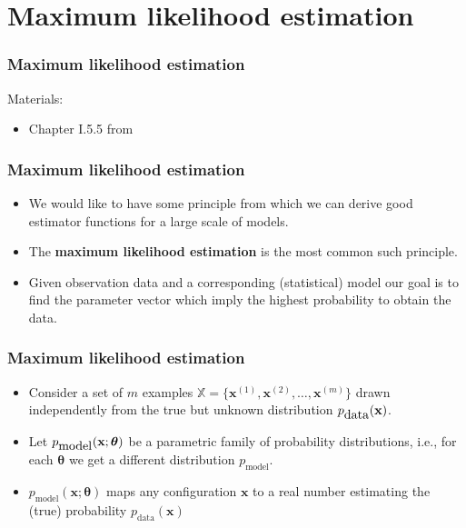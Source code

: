 \documentclass[notes]{beamer}          %
\newcommand{\vect}[1]{\bm{#1}}
\newcommand{\field}[1]{\mathbb{#1}}
\begin{document}
\section{Maximum likelihood estimation}

\begin{frame}
\frametitle{Maximum likelihood estimation}
Materials:
\begin{itemize}
    \item Chapter I.5.5 from \cite{deeplearning}
\end{itemize}
\end{frame}

\begin{frame}
\frametitle{Maximum likelihood estimation}
    \begin{itemize}
        \item We would like to have some principle from which we can derive good estimator functions for a large scale of models.
        \item The {\bf maximum likelihood estimation} is the most common such principle.
        \item Given observation data and a corresponding (statistical) model our goal is to find the parameter vector which imply the highest probability to obtain the data.
    \end{itemize}
\end{frame}


\begin{frame}
\frametitle{Maximum likelihood estimation}
    \begin{itemize}
        \item Consider a set of $m$ examples $\field{X} = \{ \vect{x}^{(1)}, \vect{x}^{(2)}, \ldots,  \vect{x}^{(m)} \}$ drawn independently from the true but unknown distribution $p_{\mbox{data}}(\text{\bf x})$.
        \item Let $p_{\mbox{model}}(\text{\bf x};\vect{\theta})$ be a parametric family of probability distributions, i.e., for each $\vect{\theta}$ we get a different distribution  $p_{\mbox{model}}$.
        \item $p_{\mbox{model}}(\vect{x};\vect{\theta})$ maps any configuration $\vect{x}$ to a real number estimating the (true) probability $p_{\mbox{data}}(\vect{x})$
    \end{itemize}
\end{frame}
\end{document}
